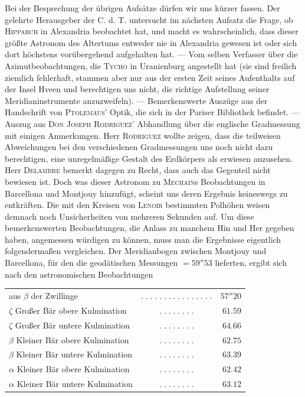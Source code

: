 Bei der Besprechung der übrigen Aufsätze dürfen wir uns kürzer fassen. Der gelehrte Herausgeber der C. d. T. untersucht im nächsten Aufsatz die Frage, ob \textsc{Hipparch} in Alexandria beobachtet hat, und macht es wahrscheinlich, dass dieser größte Astronom des Altertums entweder nie in Alexandria gewesen ist oder sich dort höchstens vorübergehend aufgehalten hat. --- Vom selben Verfasser über die Azimutbeobachtungen, die \textsc{Tycho} in Uranienburg angestellt hat (sie sind freilich ziemlich fehlerhaft, stammen aber nur aus der ersten Zeit seines Aufenthalts auf der Insel Hveen und berechtigen uns nicht, die richtige Aufstellung seiner Meridianinstrumente anzuzweifeln). --- Bemerkenswerte Auszüge aus der Handschrift von \textsc{Ptolemäus}' Optik, die sich in der Pariser Bibliothek befindet. --- Auszug aus \textsc{Don Joseph Rodriguez}' Abhandlung über die englische Gradmessung mit einigen Anmerkungen. Herr \textsc{Rodriguez} wollte zeigen, dass die teilweisen Abweichungen bei den verschiedenen Gradmessungen uns noch nicht dazu berechtigen, eine unregelmäßige Gestalt des Erdkörpers als erwiesen anzusehen. Herr \textsc{Delambre} bemerkt dagegen zu Recht, dass auch das Gegenteil nicht bewiesen ist. Doch was dieser Astronom zu \textsc{Mechain}s Beobachtungen in Barcellona und Montjouy hinzufügt, scheint uns deren Ergebnis keineswegs zu entkräften. Die mit den Kreisen von \textsc{Lenoir} bestimmten Polhöhen weisen demnach noch Unsicherheiten von mehreren Sekunden auf. Um diese bemerkenswerten Beobachtungen, die Anlass zu manchem Hin und Her gegeben haben, angemessen würdigen zu können, muss man die Ergebnisse eigentlich folgendermaßen vergleichen. Der Meridianbogen zwischen Montjouy und Barcellona, für den die geodätischen Messungen $=59''53$ lieferten, ergibt sich nach den astronomischen Beobachtungen
\begin{center}
\fontsize{9}{11}\selectfont\setlength{\tabcolsep}{3pt}\begin{tabular}{@{}l c r@{}}
aus $\beta$ der Zwillinge & $.\;.\;.\;.\;.\;.\;.\;.\;.\;.\;.\;.\;.\;.\;.\;.$ & $57''20$\\
$\zeta$ Großer Bär obere Kulmination & $.\;.\;.\;.\;.\;.\;.\;.$ & $61.59$\\
$\zeta$ Großer Bär untere Kulmination & $.\;.\;.\;.\;.\;.\;.\;.$ & $64.66$\\
$\beta$ Kleiner Bär obere Kulmination & $.\;.\;.\;.\;.\;.\;.\;.$ & $62.75$\\
$\beta$ Kleiner Bär untere Kulmination & $.\;.\;.\;.\;.\;.\;.\;.$ & $63.39$\\
$\alpha$ Kleiner Bär obere Kulmination & $.\;.\;.\;.\;.\;.\;.\;.$ & $62.42$\\
$\alpha$ Kleiner Bär untere Kulmination & $.\;.\;.\;.\;.\;.\;.\;.$ & $63.12$\\
\end{tabular}
\end{center}
